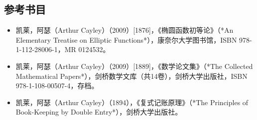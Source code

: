 \subsection{参考书目}  
\begin{itemize}
\item 凯莱，阿瑟（Arthur Cayley）（2009）[1876]，《椭圆函数初等论》（*An Elementary Treatise on Elliptic Functions*），康奈尔大学图书馆，ISBN 978-1-112-28006-1，MR 0124532。  
\item 凯莱，阿瑟（Arthur Cayley）（2009）[1889]，《数学论文集》（*The Collected Mathematical Papers*），剑桥数学文库（共14卷），剑桥大学出版社，ISBN 978-1-108-00507-4，存档。  
\item 凯莱，阿瑟（Arthur Cayley）（1894），《复式记账原理》（*The Principles of Book-Keeping by Double Entry*），剑桥大学出版社。
\end{itemize}
